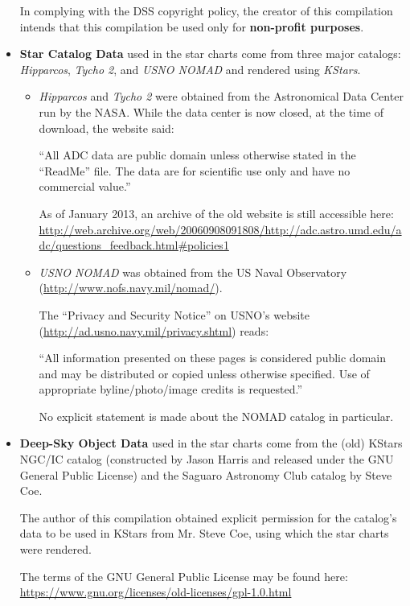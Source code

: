 \begin{itemize}
  In complying with the DSS copyright policy, the creator of this
  compilation intends that this compilation be used only for
  \textbf{non-profit purposes}.

\item \textbf{Star Catalog Data} used in the star charts come from
  three major catalogs: \emph{Hipparcos}, \emph{Tycho 2}, and
  \emph{USNO NOMAD} and rendered using \emph{KStars}.

  \begin{itemize}
    \item \emph{Hipparcos} and \emph{Tycho 2} were obtained from the
      Astronomical Data Center run by the NASA. While the data center
      is now closed, at the time of download, the website said:

      ``All ADC data are public domain unless otherwise stated in the
      ``ReadMe'' file. The data are for scientific use only and have
      no commercial value.''

      As of January 2013, an archive of the old website is still
      accessible here:
      \url{http://web.archive.org/web/20060908091808/http://adc.astro.umd.edu/adc/questions_feedback.html#policies1}

    \item \emph{USNO NOMAD} was obtained from the US Naval Observatory
      (\url{http://www.nofs.navy.mil/nomad/}).

      The ``Privacy and Security Notice'' on USNO's website
      (\url{http://ad.usno.navy.mil/privacy.shtml}) reads:

      ``All information presented on these pages is considered public
      domain and may be distributed or copied unless otherwise
      specified. Use of appropriate byline/photo/image credits is
      requested.''

      No explicit statement is made about the NOMAD catalog in
      particular.
  \end{itemize}

\item \textbf{Deep-Sky Object Data} used in the star charts come from
  the (old) KStars NGC/IC catalog (constructed by Jason Harris and
  released under the GNU General Public License) and the Saguaro
  Astronomy Club catalog by Steve Coe.

  The author of this compilation obtained explicit permission for the
  catalog's data to be used in KStars from Mr. Steve Coe, using which
  the star charts were rendered.

  The terms of the GNU General Public License may be found here:
  \url{https://www.gnu.org/licenses/old-licenses/gpl-1.0.html}


\end{itemize}
